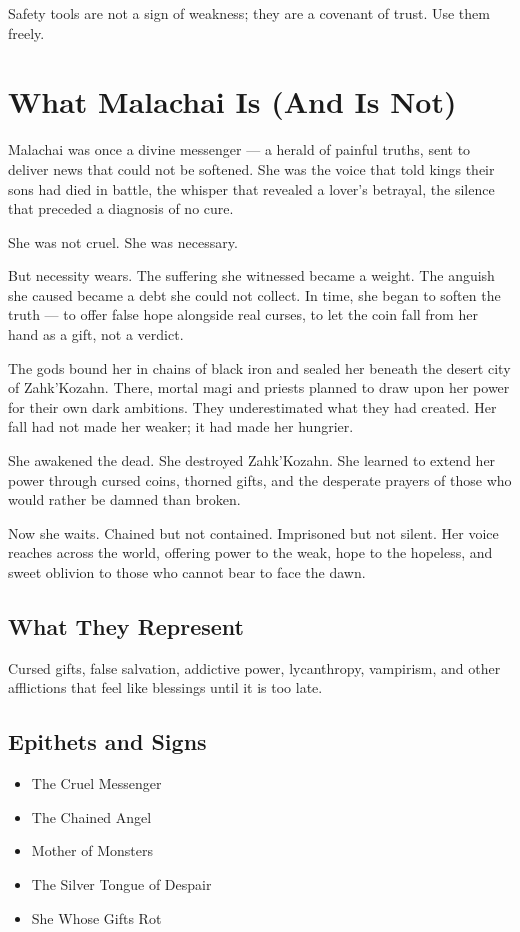 \documentclass[10pt,twoside]{book}
\begin{document}
Safety tools are not a sign of weakness; they are a covenant of trust. Use them freely.

\tableofcontents
\newpage


\chapter{What Malachai Is (And Is Not)}

Malachai was once a divine messenger --- a herald of painful truths, sent to deliver news that could not be softened. She was the voice that told kings their sons had died in battle, the whisper that revealed a lover's betrayal, the silence that preceded a diagnosis of no cure.

She was not cruel. She was necessary.

But necessity wears. The suffering she witnessed became a weight. The anguish she caused became a debt she could not collect. In time, she began to soften the truth --- to offer false hope alongside real curses, to let the coin fall from her hand as a gift, not a verdict.

The gods bound her in chains of black iron and sealed her beneath the desert city of Zahk'Kozahn. There, mortal magi and priests planned to draw upon her power for their own dark ambitions. They underestimated what they had created. Her fall had not made her weaker; it had made her hungrier.

She awakened the dead. She destroyed Zahk'Kozahn. She learned to extend her power through cursed coins, thorned gifts, and the desperate prayers of those who would rather be damned than broken.

Now she waits. Chained but not contained. Imprisoned but not silent. Her voice reaches across the world, offering power to the weak, hope to the hopeless, and sweet oblivion to those who cannot bear to face the dawn.

\section{What They Represent}
Cursed gifts, false salvation, addictive power, lycanthropy, vampirism, and other afflictions that feel like blessings until it is too late.

\section{Epithets and Signs}
\begin{itemize}
\item The Cruel Messenger
\item The Chained Angel
\item Mother of Monsters
\item The Silver Tongue of Despair
\item She Whose Gifts Rot
\end{itemize}
\end{document}
